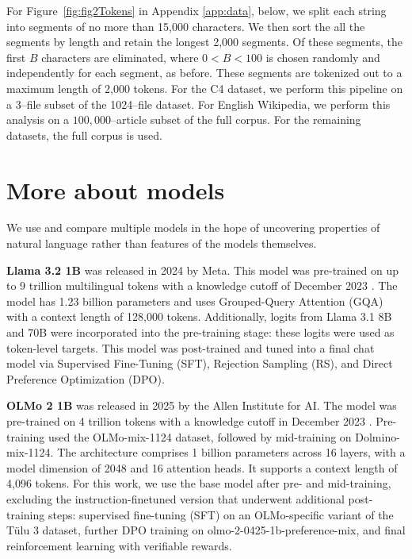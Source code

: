 \documentclass[aps,twocolumn,floats,prx]{revtex4}
\begin{document}
For Figure~\ref{fig:fig2Tokens} in Appendix \ref{app:data}, below,  we split each string into segments of no more than 15,000 characters.  We then sort the all the segments by length and retain the longest 2,000 segments.  Of these segments, the first $B$ characters are eliminated, where $0< B < 100$ is chosen randomly and independently for each segment, as before. These segments are tokenized out to a maximum length of 2,000 tokens. For the C4 dataset, we perform this pipeline on a 3--file subset of the 1024--file dataset. For English Wikipedia, we perform this analysis on a $100,000$--article subset of the full corpus. For the remaining datasets, the full corpus is used. 

\section{More about models}
\label{app:models}

We use and compare multiple models in the hope of uncovering properties of natural language rather than features of the models themselves. 

{\bf Llama 3.2 1B}
was released in 2024 by Meta. This model was pre-trained on up to 9 trillion multilingual tokens with a knowledge cutoff of December 2023 \cite{grattafiori2024llama3herdmodels}. The model has 1.23 billion parameters and uses Grouped-Query Attention (GQA) with a context length of 128,000 tokens. Additionally, logits from Llama 3.1 8B and 70B were incorporated into the pre-training stage: these logits were used as token-level targets. This model was post-trained and tuned into a final chat model via Supervised Fine-Tuning (SFT), Rejection Sampling (RS), and Direct Preference Optimization (DPO).

{\bf OLMo 2 1B}
was released in 2025 by the Allen Institute for AI. The model was pre-trained on 4 trillion tokens with a knowledge cutoff in December 2023 \cite{olmo20242olmo2furious}. Pre-training used the OLMo-mix-1124 dataset, followed by mid-training on Dolmino-mix-1124. The architecture comprises 1 billion parameters across 16 layers, with a model dimension of 2048 and 16 attention heads. It supports a context length of 4,096 tokens. For this work, we use the base model after pre- and mid-training, excluding the instruction-finetuned version that underwent additional post-training steps: supervised fine-tuning (SFT) on an OLMo-specific variant of the Tülu 3 dataset, further DPO training on olmo-2-0425-1b-preference-mix, and final reinforcement learning with verifiable rewards.
\end{document}
